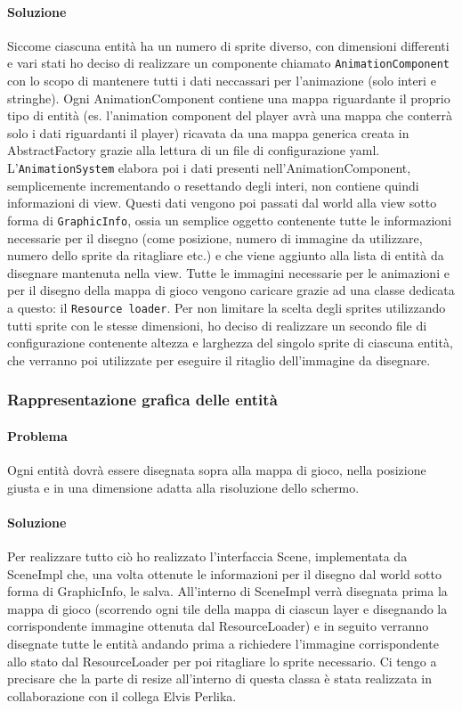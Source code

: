 \documentclass[a4paper,12pt]{report}
\begin{document}
\paragraph*{Soluzione}
	Siccome ciascuna entità ha un numero di sprite diverso, con dimensioni differenti e vari stati ho deciso di realizzare un componente chiamato \texttt{AnimationComponent} con lo scopo di mantenere tutti i dati neccassari per l'animazione (solo interi e stringhe). Ogni AnimationComponent contiene una mappa riguardante il proprio tipo di entità (es. l'animation component del player avrà una mappa che conterrà solo i dati riguardanti il player) ricavata da una mappa generica creata in AbstractFactory grazie alla lettura di un file di configurazione yaml.
	L'\texttt{AnimationSystem} elabora poi i dati presenti nell'AnimationComponent, semplicemente incrementando o resettando degli interi, non contiene quindi informazioni di view. 
	Questi dati vengono poi passati dal world alla view sotto forma di \texttt{GraphicInfo}, ossia un semplice oggetto contenente tutte le informazioni necessarie per il disegno (come posizione, numero di immagine da utilizzare, numero dello sprite da ritagliare etc.) e che viene aggiunto alla lista di entità da disegnare mantenuta nella view.
	Tutte le immagini necessarie per le animazioni e per il disegno della mappa di gioco vengono caricare grazie ad una classe dedicata a questo: il \texttt{Resource loader}.
	Per non limitare la scelta degli sprites utilizzando tutti sprite con le stesse dimensioni, ho deciso di realizzare un secondo file di configurazione contenente altezza e larghezza del singolo sprite di ciascuna entità, che verranno poi utilizzate per eseguire il ritaglio dell'immagine da disegnare.

\subsubsection{Rappresentazione grafica delle entità}
\paragraph*{Problema}
	Ogni entità dovrà essere disegnata sopra alla mappa di gioco, nella posizione giusta e in una dimensione adatta alla risoluzione dello schermo.
\paragraph*{Soluzione}
	Per realizzare tutto ciò ho realizzato l'interfaccia Scene, implementata da SceneImpl che, una volta ottenute le informazioni per il disegno dal world sotto forma di GraphicInfo, le salva.
	All'interno di SceneImpl verrà disegnata prima la mappa di gioco (scorrendo ogni tile della mappa di ciascun layer e disegnando la corrispondente immagine ottenuta dal ResourceLoader) e in seguito verranno disegnate tutte le entità andando prima a richiedere l'immagine corrispondente allo stato dal ResourceLoader per poi ritagliare lo sprite necessario.
	Ci tengo a precisare che la parte di resize all'interno di questa classa è stata realizzata in collaborazione con il collega Elvis Perlika.
\end{document}
